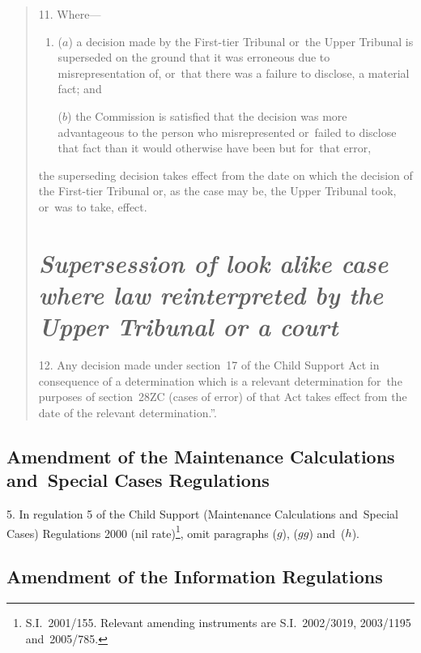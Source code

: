 \documentclass[12pt,a4paper]{article}
\begin{document}
\begin{quotation}
11.  Where—
\begin{enumerate}\item[]
($a$) a decision made by the First-tier Tribunal or~the Upper Tribunal is superseded on the ground that it was erroneous due to misrepresentation of, or~that there was a failure to disclose, a material fact; and

($b$) the Commission is satisfied that the decision was more advantageous to the person who misrepresented or~failed to disclose that fact than it would otherwise have been but for~that error,
\end{enumerate}
the superseding decision takes effect from the date on which the decision of the First-tier Tribunal or, as the case may be, the Upper Tribunal took, or~was to take, effect.

\enlargethispage{-4\baselineskip}

\section*{\itshape\sloppy{} Supersession of look alike case where law reinterpreted by the Upper Tribunal or a court}

12.  Any decision made under section~17 of the Child Support Act in consequence of a determination which is a relevant determination for~the purposes of section~28ZC (cases of error) of that Act takes effect from the date of the relevant determination.”.
\end{quotation}


\subsection[5. Amendment of the Maintenance Calculations and~Special Cases Regulations]{Amendment of the Maintenance Calculations and~Special Cases Regulations}

5.  In regulation 5 of the Child Support (Maintenance Calculations and~Special Cases) Regulations 2000 (nil rate)\footnote{S.I.~2001/155. Relevant amending instruments are S.I.~2002/3019, 2003/1195 and~2005/785.}, omit paragraphs ($g$), ($gg$)  and~($h$).

\enlargethispage{-4\baselineskip}

\subsection[6. Amendment of the Information Regulations]{Amendment of the Information Regulations}
\end{document}

